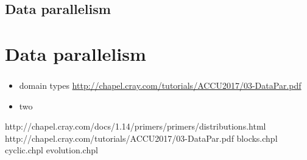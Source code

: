 
\section{Data parallelism}
\chapter{Data parallelism}
\subsection{} %

\begin{frame}{}
  \begin{itemize}\setlength{\itemsep}{3mm}
    \item domain types \url{http://chapel.cray.com/tutorials/ACCU2017/03-DataPar.pdf}
    \item two
  \end{itemize}
\end{frame}

http://chapel.cray.com/docs/1.14/primers/primers/distributions.html
http://chapel.cray.com/tutorials/ACCU2017/03-DataPar.pdf
blocks.chpl
cyclic.chpl
evolution.chpl
